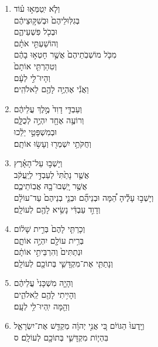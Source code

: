 \documentclass[12pt,a4paper,titlepage]{article}
\def \pscolor{red} %
\def \pslabelsep{-0.75em} %
\def \psleftmargin{0em} %
\begin{document}
\begin{hebrew}
\begin{enumerate}[leftmargin=\psleftmargin, labelsep=\pslabelsep, label=\fontspec{Linux Libertine}\arabic*, font=\color{\pscolor}\small\textsuperscript, parsep=0em, itemsep=0em, topsep=0em]
            \item וְלֹ֧א יִֽטַמְּא֣וּ ע֗וֹד \\ בְּגִלּֽוּלֵיהֶם֙ וּבְשִׁקּ֣וּצֵיהֶ֔ם \\ וּבְכֹ֖ל פִּשְׁעֵיהֶ֑ם \\ וְהוֹשַׁעְתִּ֣י אֹתָ֗ם \\ מִכֹּ֤ל מוֹשְׁבֹֽתֵיהֶם֙ אֲשֶׁ֣ר חָטְא֣וּ בָהֶ֔ם \\ וְטִהַרְתִּ֤י אוֹתָם֙ \\ וְהָיוּ־לִ֣י לְעָ֔ם \\ וַאֲנִ֕י אֶהְיֶ֥ה לָהֶ֖ם לֵאלֹהִֽים׃
            \item וְעַבְדִּ֤י דָוִד֙ מֶ֣לֶךְ עֲלֵיהֶ֔ם \\ וְרוֹעֶ֥ה אֶחָ֖ד יִהְיֶ֣ה לְכֻלָּ֑ם \\ וּבְמִשְׁפָּטַ֣י יֵלֵ֔כוּ \\ וְחֻקֹּתַ֥י יִשְׁמְר֖וּ וְעָשׂ֥וּ אוֹתָֽם׃
            \item וְיָשְׁב֣וּ עַל־הָאָ֗רֶץ \\ אֲשֶׁ֤ר נָתַ֙תִּי֙ לְעַבְדִּ֣י לְיַֽעֲקֹ֔ב \\ אֲשֶׁ֥ר יָֽשְׁבוּ־בָ֖הּ אֲבֽוֹתֵיכֶ֑ם \\ וְיָשְׁב֣וּ עָלֶ֡יהָ הֵ֠מָּה וּבְנֵיהֶ֞ם וּבְנֵ֤י בְנֵיהֶם֙ עַד־עוֹלָ֔ם \\ וְדָוִ֣ד עַבְדִּ֔י נָשִׂ֥יא לָהֶ֖ם לְעוֹלָֽם׃
            \item וְכָרַתִּ֤י לָהֶם֙ בְּרִ֣ית שָׁל֔וֹם \\ בְּרִ֥ית עוֹלָ֖ם יִהְיֶ֣ה אוֹתָ֑ם \\ וּנְתַתִּים֙ וְהִרְבֵּיתִ֣י אוֹתָ֔ם \\ וְנָתַתִּ֧י אֶת־מִקְדָּשִׁ֛י בְּתוֹכָ֖ם לְעוֹלָֽם׃
            \item וְהָיָ֤ה מִשְׁכָּנִי֙ עֲלֵיהֶ֔ם \\ וְהָיִ֥יתִי לָהֶ֖ם לֵֽאלֹהִ֑ים \\ וְהֵ֖מָּה יִֽהְיוּ־לִ֥י לְעָֽם׃
            \item וְיָֽדְעוּ֙ הַגּוֹיִ֔ם כִּ֚י אֲנִ֣י יְהוָ֔ה מְקַדֵּ֖שׁ אֶת־יִשְׂרָאֵ֑ל \\ בִּהְי֧וֹת מִקְדָּשִׁ֛י בְּתוֹכָ֖ם לְעוֹלָֽם׃ ס
      \end{enumerate}
\end{hebrew}
\end{document}
